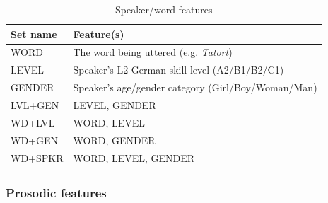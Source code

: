 \begin{table}
			\begin{subtable}[h]{\textwidth}
				\centering
				\caption{Speaker/word features}
				\begin{tabularx}{.9\textwidth}{lX}
				\toprule
				Set name & Feature(s) \\
				\midrule
				WORD & The word being uttered (e.g. \textit{Tatort}) \\
				LEVEL & Speaker's L2 German skill level (A2/B1/B2/C1)\\
				GENDER & Speaker's age/gender category (Girl/Boy/Woman/Man)\\
				LVL+GEN & LEVEL, GENDER \\
				WD+LVL & WORD, LEVEL \\
				WD+GEN & WORD, GENDER \\
				WD+SPKR & WORD, LEVEL, GENDER \\
				\bottomrule
				\end{tabularx}
				\label{tab:features:sets:spkrword}		
			\end{subtable}
				
			\label{tab:features:sets}
		\end{table}
		
		
		\subsubsection{Prosodic features}
		\label{sec:classification:features:prosodic}
		
		
